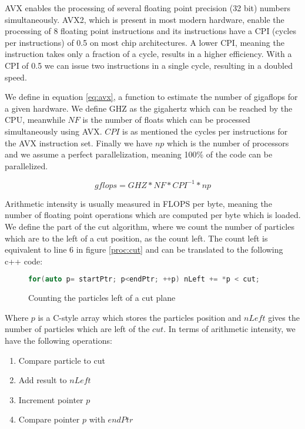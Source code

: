\documentclass[]{article}
\begin{document}
AVX enables the processing of several floating point precision (32 bit) numbers simultaneously. AVX2, which is present in most modern hardware, enable the processing of 8 floating point instructions and its instructions have a CPI (cycles per instructions) of 0.5 on most chip architectures. A lower CPI, meaning the instruction takes only a fraction of a cycle, results in a higher efficiency. With a CPI of 0.5 we can issue two instructions in a single cycle, resulting in a doubled speed.

We define in equation \ref{eq:avx}, a function to estimate the number of gigaflops for a given hardware. We define GHZ as the gigahertz which can be reached by the CPU, meanwhile $NF$ is the number of floats which can be processed simultaneously using AVX. $CPI$ is as mentioned the cycles per instructions for the AVX instruction set. Finally we have $np$ which is the number of processors and  we assume a perfect parallelization, meaning 100\% of the code can be parallelized.

\begin{center}
	\begin{equation}
		gflops = GHZ * NF * CPI^{-1} * np
	\end{equation}
\label{eq:avx}
\end{center}

Arithmetic intensity is usually measured in FLOPS per byte, meaning the number of floating point operations which are computed per byte which is loaded. We define the part of the cut algorithm, where we count the number of particles which are to the left of a cut position, as the count left. The count left is equivalent to line 6 in figure  \ref{proc:cut} and can be translated to the following c++ code:

\begin{figure}[H]
	\begin{lstlisting}[language=c++]
		for(auto p= startPtr; p<endPtr; ++p) nLeft += *p < cut;
	\end{lstlisting}
\caption{Counting the particles left of a cut plane}

\end{figure}


Where $p$ is a C-style array which stores the particles position and $nLeft$ gives the number of particles which are left of the $cut$. In terms of arithmetic intensity, we have the following operations:

\begin{enumerate}
	\item Compare particle to cut
	\item Add result to $nLeft$
	\item Increment pointer $p$
	\item Compare pointer $p$ with $endPtr$
\end{enumerate}
\end{document}
